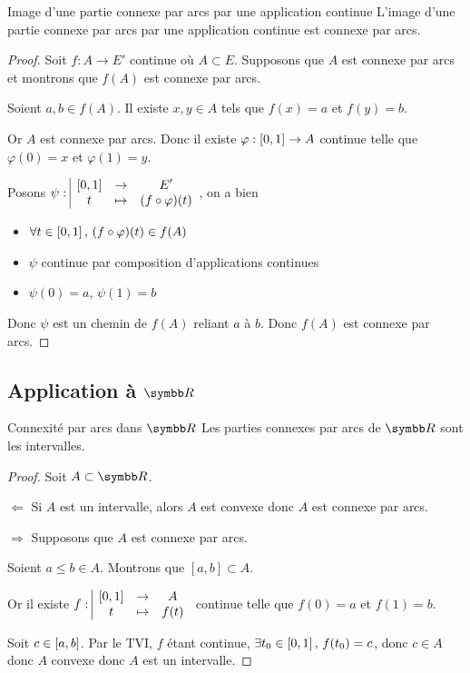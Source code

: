 \begin{theoreme}{Image d'une partie connexe par arcs par une application continue}{}
    L'image d'une partie connexe par arcs par une application continue est connexe par arcs.
\end{theoreme}

\begin{proof}
    Soit $f : A \to E'$ continue où $A \subset E$. Supposons que 
    $A$ est connexe par arcs et montrons que $f(A)$ est connexe par arcs. 

    Soient $a, b \in f(A)$. Il existe $x, y \in A$ tels que $f(x) = a$ et $f(y) = b$.
     
    Or $A$ est connexe par arcs. 
    Donc il existe $\varphi : \left[0, 1\right] \to A$ continue telle que $\varphi(0) = x$ et $\varphi(1) = y$.

    Posons $\psi: \space \begin{array}{|ccc} \displaystyle \left[0, 1\right] & \to & \displaystyle E' \\ \displaystyle t & \mapsto & \displaystyle  (f \circ \varphi)(t) \end{array}$, on a bien 

    \begin{itemize}
        \item $\forall t \in \left[0, 1\right], \, (f \circ \varphi) (t) \in f(A) $ 
        \item $\psi$ continue par composition d'applications continues
        \item $\psi(0) = a, \, \psi(1) = b$
    \end{itemize}

    Donc $\psi $ est un chemin de $f(A)$ reliant $a$ à $b$. Donc $f(A)$ est connexe par arcs.
\end{proof}

\subsection{Application à \texorpdfstring{$\R$}{R}}

\begin{theoreme}{Connexité par arcs dans $\R$}{}
    Les parties connexes par arcs de $\R$ sont les intervalles.
\end{theoreme}


\begin{proof}
    Soit $A \subset \R$. 

    $\Leftarrow$ Si $A$ est un intervalle, alors $A$ est convexe donc $A$ est connexe par arcs.

    $\Rightarrow$ Supposons que $A$ est connexe par arcs. 

    Soient $a \leqslant b \in A$. Montrons que $[a, b] \subset A$.

    Or il existe $f: \space \begin{array}{|ccc} \displaystyle \left[0, 1\right] & \to & \displaystyle A \\ \displaystyle t & \mapsto & \displaystyle f(t) \end{array}$ continue telle que $f(0) = a$ et $f(1) = b$.

    Soit $c \in \left[a, b\right]$. Par le TVI, $f$ étant continue, $\exists t_0 \in \left[0, 1\right], \, f(t_0) = c$, 
    donc $c \in A$ donc $A$ convexe donc $A$ est un intervalle.
\end{proof}

